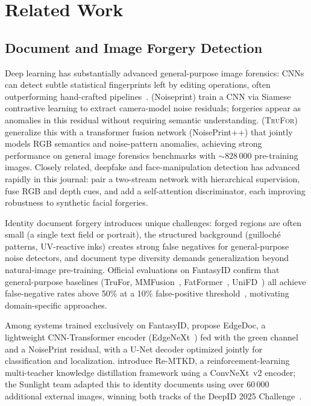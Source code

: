 \documentclass[final,5p,times,twocolumn,number]{elsarticle}
\newcommand{\revB}[1]{#1}
\begin{document}

\section{Related Work}
\label{sec:related}

\subsection{Document and Image Forgery Detection}

Deep learning has substantially advanced general-purpose image forensics:
CNNs can detect subtle statistical fingerprints left by editing operations,
often outperforming hand-crafted pipelines~\citep{mantranet2019}.
\citet{cozzolino2020noiseprint} (Noiseprint) train a CNN via Siamese
contrastive learning to extract camera-model noise residuals; forgeries appear
as anomalies in this residual without requiring semantic understanding.
\citet{trufor2023} (\textsc{TruFor}) generalize this with a transformer fusion
network (NoisePrint++) that jointly models RGB semantics and noise-pattern
anomalies, achieving strong performance on general image forensics benchmarks
with ${\sim}828\,000$ pre-training images. \revB{Closely related, deepfake and
face-manipulation detection has advanced rapidly in this journal:
\citet{liang2023twostream} pair a two-stream network with hierarchical
supervision, \citet{leporoni2024guided} fuse {RGB} and depth cues, and
\citet{wang2024deepfake} add a self-attention discriminator, each improving
robustness to synthetic facial forgeries.}

Identity document forgery introduces unique challenges: forged regions are
often small (a single text field or portrait), the structured background
(guilloché patterns, UV-reactive inks) creates strong false negatives for
general-purpose noise detectors, and document type diversity demands
generalization beyond natural-image pre-training. Official evaluations on
FantasyID confirm that general-purpose baselines (TruFor, MMFusion~\citep{mmfusion2024},
FatFormer~\citep{fatformer2024}, UniFD~\citep{unifd2023}) all achieve
false-negative rates above 50\% at a 10\% false-positive
threshold~\citep{fantasyid2024}, motivating domain-specific approaches.

Among systems trained exclusively on FantasyID, \citet{edgedoc2025} propose
EdgeDoc, a lightweight CNN-Transformer encoder (EdgeNeXt~\citep{edgenext2022}) fed with the green
channel and a NoisePrint residual, with a U-Net decoder optimized jointly for
classification and localization. \citet{remtkd2025} introduce Re-MTKD, a
reinforcement-learning multi-teacher knowledge distillation framework using a
ConvNeXt~v2 encoder; the Sunlight team adapted this to identity documents using
over 60\,000 additional external images, winning both tracks of the DeepID
2025 Challenge~\citep{deepid2025challenge}.
\end{document}
